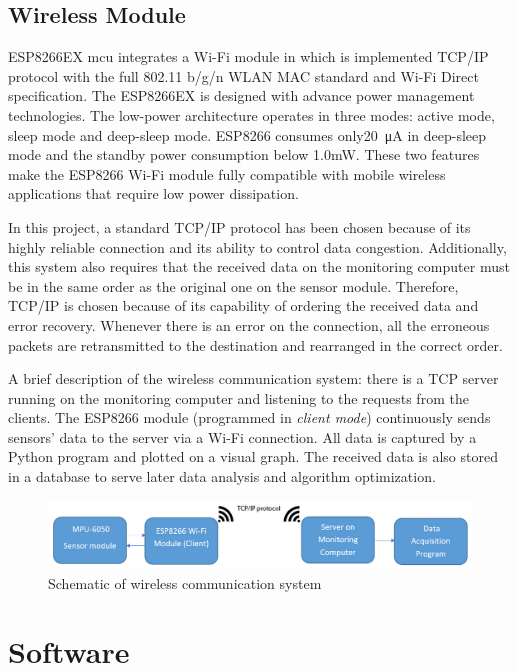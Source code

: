 \documentclass[letterpaper,12pt,titlepage,oneside,final]{book}
\begin{document}
\subsection{Wireless Module}
ESP8266EX \gls{mcu} integrates a Wi-Fi module in which is implemented TCP/IP protocol with the full 802.11 b/g/n WLAN MAC standard and Wi-Fi Direct specification. The ESP8266EX is designed with advance power management technologies. The low-power architecture operates in three modes: active mode, sleep mode and deep-sleep mode. ESP8266 consumes only\SI{20}{\micro\ampere} in deep-sleep mode and the standby power consumption below 1.0mW. These two features make the ESP8266 Wi-Fi module fully compatible with mobile wireless applications that require low power dissipation. \par
In this project, a standard TCP/IP protocol has been chosen because of its highly reliable connection and its ability to control data congestion. Additionally, this system also requires that the received data on the monitoring computer must be in the same order as the original one on the sensor module. Therefore, TCP/IP is chosen because of its capability of ordering the received data and error recovery. Whenever there is an error on the connection, all the erroneous packets are retransmitted to the destination and rearranged in the correct order.\par 
A brief description of the wireless communication system: there is a TCP server running on the monitoring computer and listening to the requests from the clients. The ESP8266 module (programmed in \textit{client mode}) continuously sends sensors' data to the server via a Wi-Fi connection. All data is captured by a Python program and plotted on a visual graph. The received data is also stored in a database to serve later data analysis and algorithm optimization. 
\begin{figure}[h!]
	\centering
	\includegraphics[scale=0.38]{system_schematic}
	\caption{Schematic of wireless communication system}
\end{figure} 
\section{Software}
\end{document}
